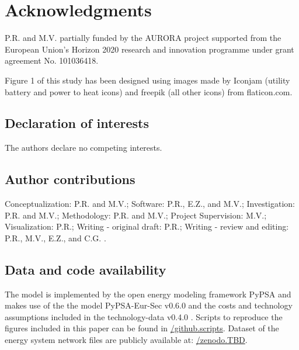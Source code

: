\documentclass[review]{elsarticle}
\newcommand{\beginsupplement}{%
	\setcounter{table}{0}
	\renewcommand{\thetable}{S\arabic{table}}%
	\setcounter{figure}{0}
	\renewcommand{\thefigure}{S\arabic{figure}}%
	\setcounter{section}{0}
	\renewcommand{\thesection}{Supplemental \arabic{section}}%
	\setcounter{equation}{0}
	\renewcommand{\theequation}{S\arabic{equation}}
	\setcounter{page}{1}
}
\begin{document}
\section{Acknowledgments}
P.R. and M.V. partially funded by the AURORA project supported from the European Union’s Horizon 2020 research and innovation programme under grant agreement No. 101036418.

Figure 1 of this study has been designed using images made by Iconjam (utility battery and power to heat icons) and freepik (all other icons) from flaticon.com.


\subsection{Declaration of interests}
The authors declare no competing interests.

\subsection{Author contributions}

Conceptualization: P.R. and M.V.; Software: P.R., E.Z., and M.V.; Investigation: P.R. and M.V.; Methodology: P.R. and M.V.; Project  Supervision: M.V.; Visualization: P.R.; Writing - original draft: P.R.; Writing - review and editing: P.R., M.V., E.Z., and C.G. .


\subsection*{Data and code availability}

The model is implemented by the open energy modeling framework PyPSA and makes use of the the model PyPSA-Eur-Sec v0.6.0 \cite{pypsa_docs} and the costs and technology assumptions included in the technology-data v0.4.0 \cite{pypsa_costs}. Scripts to reproduce the figures included in this paper can be found in \href{https://github.com/Parisra/Distributed-PV-paper}{/github.scripts}. Dataset of the energy system network files are  publicly available at: \href{}{/zenodo.TBD}.



\newpage
{}


\clearpage
\onecolumn

\glsaddallunused
\printglossary[type=\acronymtype]


\beginsupplement


\restoregeometry
\newpage
\fontsize{10}{12}\selectfont
{}


\clearpage
\tableofcontents
\end{document}
